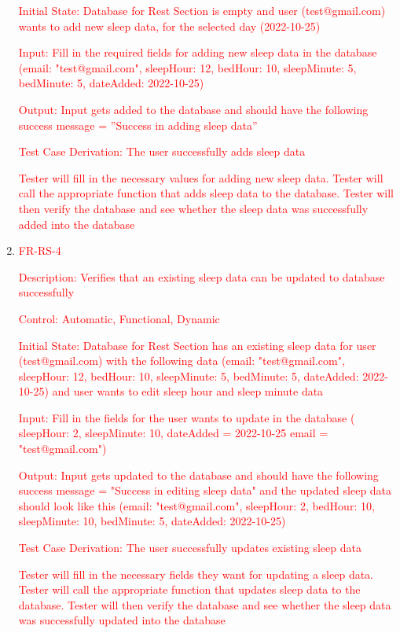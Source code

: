 \documentclass[12pt, titlepage]{article}
\begin{document}
\begin{enumerate}
	\textcolor{red}{Initial State: Database for Rest Section
    is empty and user (test@gmail.com) wants to add new sleep data, for the selected day (2022-10-25)}
	
	\textcolor{red}{Input: Fill in the required fields for adding new sleep data in the
        database (email: "test@gmail.com", sleepHour: 12, bedHour: 10, sleepMinute: 5, bedMinute: 5, dateAdded: 2022-10-25)}
	
	\textcolor{red}{Output: Input gets added to the database and should have the
        following success message = ”Success in adding sleep data”}
	
	\textcolor{red}{Test Case Derivation: The user successfully adds sleep data}
	
	\textcolor{red}{ Tester will fill in the necessary values for adding new sleep data. Tester will call the appropriate function that adds sleep data to the database. Tester will then verify the database and see whether the sleep data was successfully added into the database}

  \item{\textcolor{red}{FR-RS-4\\}}

 \textcolor{red}{Description: Verifies that an existing sleep data can be updated to database successfully}
	
	\textcolor{red}{Control: Automatic, Functional, Dynamic}
	
	\textcolor{red}{Initial State: Database for Rest Section has an existing sleep data for user (test@gmail.com) with the following data (email: "test@gmail.com", sleepHour: 12, bedHour: 10, sleepMinute: 5, bedMinute: 5, dateAdded: 2022-10-25) and user wants to edit sleep hour and sleep minute data}
	
	\textcolor{red}{Input: Fill in the fields for the user wants to update in the database ( sleepHour: 2, sleepMinute: 10, dateAdded = 2022-10-25 email = "test@gmail.com")}
	
	\textcolor{red}{Output: Input gets updated to the database and should have the following success message = "Success in editing sleep data" and the updated sleep data should look like this (email: "test@gmail.com", sleepHour: 2, bedHour: 10, sleepMinute: 10, bedMinute: 5, dateAdded: 2022-10-25)}
	
	\textcolor{red}{Test Case Derivation: The user successfully updates existing sleep data}
	
	\textcolor{red}{Tester will fill in the necessary fields they want for updating a sleep data. Tester will call the appropriate function that updates sleep data to the database. Tester will then verify the database and see whether the sleep data was successfully updated into the database}


\end{enumerate}
\end{document}

